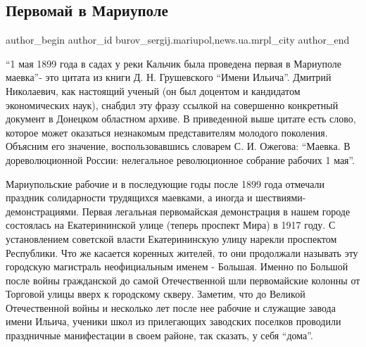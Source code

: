  
 
 
 
 
 
\subsection{Первомай в Мариуполе}
\label{sec:30_04_2017.stz.news.ua.mrpl_city.1.pervomaj_v_mariupole}
 
\ifcmt
 author_begin
   author_id burov_sergij.mariupol,news.ua.mrpl_city
 author_end
\fi

\enquote{1 мая 1899 года в садах у реки Кальчик была проведена первая в Мариуполе
маевка}- это цитата из книги Д. Н. Грушевского \enquote{Имени Ильича}. Дмитрий
Николаевич, как настоящий ученый (он был доцентом и кандидатом экономических
наук), снабдил эту фразу ссылкой на совершенно конкретный документ в Донецком
областном архиве. В приведенной выше цитате есть слово, которое может
оказаться не­знакомым представителям молодого поколения. Объясним его значение,
воспользовавшись словарем С. И. Ожегова: \enquote{Маевка. В дореволюционной России:
нелегальное революционное собрание рабочих 1 мая}.


Мариупольские рабочие и в последующие годы после 1899 года отмечали праздник
солидарности трудящихся маевками, а иногда и шествиями-демонстрациями. Первая
легальная первомайская демонстрация в нашем городе состоялась на Екатерининской
улице (теперь про­спект Мира) в 1917 году. С установлением советской власти
Екатерининскую улицу нарекли проспектом Республики. Что же касается коренных
жителей, то они продолжали называть эту городскую магистраль неофициальным
именем - Большая. Именно по Большой после войны гражданской до самой
Отечественной шли первомайские колонны от Торговой улицы вверх к городскому
скверу. Заметим, что до Великой Отечественной войны и не­сколько лет после нее
рабочие и служащие завода имени Ильича, ученики школ из прилегающих заводских
поселков проводили праздничные манифестации в своем районе, так сказать, у себя
\enquote{дома}.

